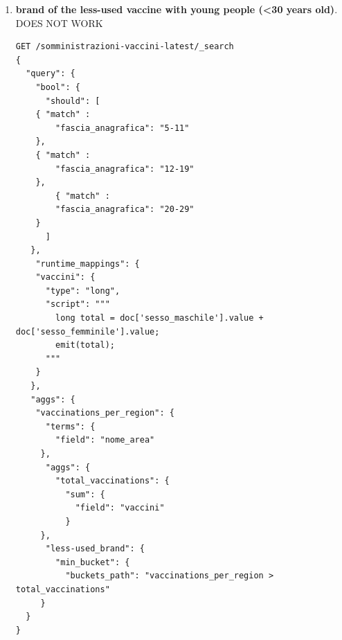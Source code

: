 \documentclass{article}
\begin{document}
\begin{enumerate}
\begin{lstlisting}
\end{lstlisting}
\item \textbf{brand of the less-used vaccine with young people (<30 years old)}.\\
DOES NOT WORK
\begin{lstlisting}
GET /somministrazioni-vaccini-latest/_search
{
  "query": {
    "bool": {
      "should": [
	{ "match" : 
	    "fascia_anagrafica": "5-11" 
	},
	{ "match" : 
	    "fascia_anagrafica": "12-19" 
	},
        { "match" : 
	    "fascia_anagrafica": "20-29" 
	}
      ]
   },
    "runtime_mappings": {
    "vaccini": {
      "type": "long",
      "script": """
        long total = doc['sesso_maschile'].value + doc['sesso_femminile'].value;
        emit(total);
      """
    }
   },
   "aggs": {
    "vaccinations_per_region": {
      "terms": {
        "field": "nome_area"
     },
      "aggs": {
        "total_vaccinations": {
          "sum": {
            "field": "vaccini"
          }
     },
      "less-used_brand": {
        "min_bucket": {
          "buckets_path": "vaccinations_per_region > total_vaccinations" 
     }
  }
}
\end{lstlisting}
\end{enumerate}
\end{document}

